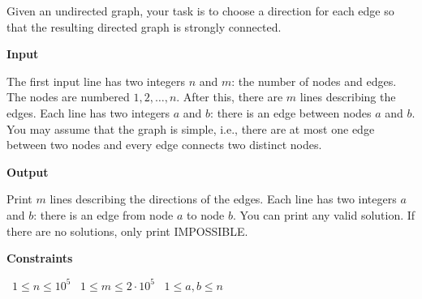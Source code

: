Given an undirected graph, your task is to choose a direction for each edge so that the resulting directed graph is strongly connected.

\vspace{0.3cm}\noindent\textbf{Input}

The first input line has two integers $n$ and $m$: the number of nodes and edges. The nodes are numbered $1,2,\dots,n$.
After this, there are $m$ lines describing the edges. Each line has two integers $a$ and $b$: there is an edge between nodes $a$ and $b$.
You may assume that the graph is simple, i.e., there are at most one edge between two nodes and every edge connects two distinct nodes.

\vspace{0.3cm}\noindent\textbf{Output}

Print $m$ lines describing the directions of the edges. Each line has two integers $a$ and $b$: there is an edge from node $a$ to node $b$. You can print any valid solution.
If there are no solutions, only print IMPOSSIBLE.

\vspace{0.3cm}\noindent\textbf{Constraints}

\textbullet\ $1 \le n \le 10^5$
\textbullet\ $1 \le m \le 2 \cdot 10^5$
\textbullet\ $1 \le a,b \le n$